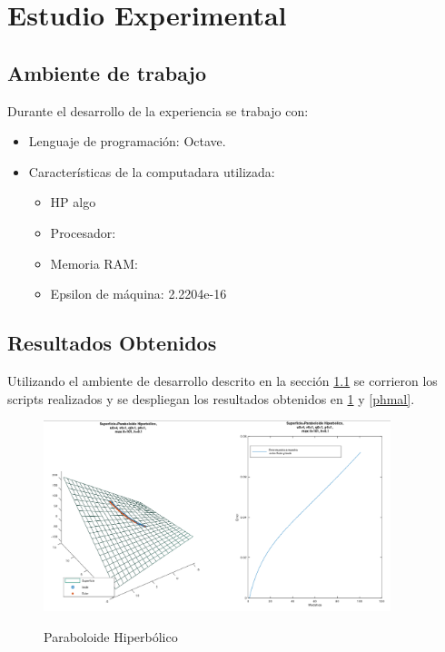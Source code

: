 \documentclass{endm}
\begin{document}
%
\section{Estudio Experimental}\label{Resultados}
\subsection{Ambiente de trabajo}\label{ambiente}
Durante el desarrollo de la experiencia se trabajo con:
\begin{itemize}
    \item Lenguaje de programaci\'on: Octave.
    \item Caracter\'isticas de la computadara utilizada:
    \begin{itemize}
        \item HP algo
        \item Procesador:
        \item Memoria RAM:
        \item Epsilon de m\'aquina: 2.2204e-16
    \end{itemize}
\end{itemize}


\subsection{Resultados Obtenidos}
Utilizando el ambiente de desarrollo descrito en la secci\'on \ref{ambiente} se corrieron los scripts realizados \cite{scripts} y se despliegan los resultados obtenidos en \ref{ph} y \ref{phmal}.



\begin{figure}[H]
\caption{Paraboloide Hiperb\'olico}
\centering
\includegraphics[width=0.9\textwidth]{ph.png}
\label{ph}
\end{figure}
\end{document}

